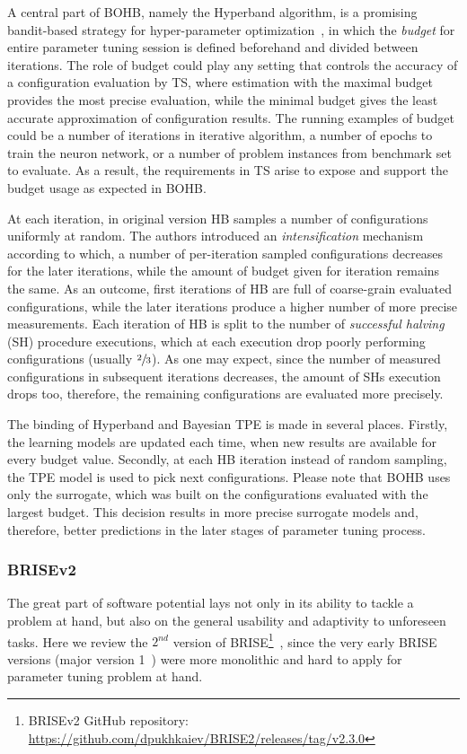 A central part of BOHB, namely the Hyperband algorithm, is a promising bandit-based strategy for hyper-parameter optimization~\cite{li2017hyperband}, in which the \emph{budget} for entire parameter tuning session is defined beforehand and divided between iterations. The role of budget could play any setting that controls the accuracy of a configuration evaluation by TS, where estimation with the maximal budget provides the most precise evaluation, while the minimal budget gives the least accurate approximation of configuration results.
The running examples of budget could be a number of iterations in iterative algorithm, a number of epochs to train the neuron network, or a number of problem instances from benchmark set to evaluate. As a result, the requirements in TS arise to expose and support the budget usage as expected in BOHB.

At each iteration, in original version HB samples a number of configurations uniformly at random. The authors introduced an \emph{intensification} mechanism according to which, a number of per-iteration sampled configurations decreases for the later iterations, while the amount of budget given for iteration remains the same. As an outcome, first iterations of HB are full of coarse-grain evaluated configurations, while the later iterations produce a higher number of more precise measurements. Each iteration of HB is split to the number of \emph{successful halving} (SH) procedure executions, which at each execution drop poorly performing configurations (usually $\sfrac{2}{3}$). As one may expect, since the number of measured configurations in subsequent iterations decreases, the amount of SHs execution drops too, therefore, the remaining configurations are evaluated more precisely.

The binding of Hyperband and Bayesian TPE is made in several places. Firstly, the learning models are updated each time, when new results are available for every budget value. Secondly, at each HB iteration instead of random sampling, the TPE model is used to pick next configurations. Please note that BOHB uses only the surrogate, which was built on the configurations evaluated with the largest budget. This decision results in more precise surrogate models and, therefore, better predictions in the later stages of parameter tuning process.


\subsubsection{BRISEv2}\label{bg: brise}
The great part of software potential lays not only in its ability to tackle a problem at hand, but also on the general usability and adaptivity to unforeseen tasks.
Here we review the $2^{nd}$ version of BRISE\footnote{BRISEv2 GitHub repository: \url{https://github.com/dpukhkaiev/BRISE2/releases/tag/v2.3.0}}~\cite{brise2spl}, since the very early BRISE versions (major version 1~\cite{brise1monolite}) were more monolithic and hard to apply for parameter tuning problem at hand.

